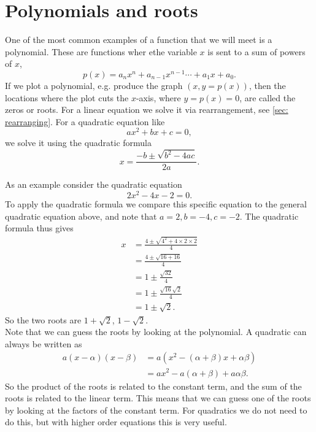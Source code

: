 \section{Polynomials and roots}
One of the most common examples of a function that we will meet is a polynomial. These are functions wher ethe variable $x$ is sent to a sum of powers of $x$,
\begin{equation}
p(x)=a_{n}x^{n}+a_{n-1}x^{n-1}\cdots +a_{1}x+a_{0}.
\label{eq: polynomial}
\end{equation}
If we plot a polynomial, e.g. produce the graph $(x,y=p(x))$, then the locations where the plot cuts the $x$-axis, where $y=p(x)=0$, are called the zeros or roots. For a linear equation we solve it via rearrangement, see \cref{sec: rearranging}. For a quadratic equation like
\begin{equation*}
ax^{2}+bx+c=0,
\end{equation*}
we solve it using the quadratic formula
\begin{equation}
x=\frac{-b\pm\sqrt{b^{2}-4ac}}{2a}.
\end{equation}

As an example consider the quadratic equation
\begin{equation*}
2x^{2}-4x-2=0.
\end{equation*}
To apply the quadratic formula we compare this specific equation to the general quadratic equation above, and note that $a=2,b=-4,c=-2$. The quadratic formula thus gives
\begin{align*}
x 	&=\frac{4\pm\sqrt{4^{2}+4\times2\times2}}{4}\\
	&=\frac{4\pm\sqrt{16+16}}{4}\\
	&=1\pm\frac{\sqrt{32}}{4}\\
	&=1\pm\frac{\sqrt{16}\sqrt{2}}{4}\\
	&=1\pm\sqrt{2}.
\end{align*}
So the two roots are $1+\sqrt{2}$, $1-\sqrt{2}$.\\

Note that we can guess the roots by looking at the polynomial. A quadratic can always be written as 
\begin{align*}
a(x-\alpha)(x-\beta)	&=a\left(x^{2}-(\alpha+\beta)x+\alpha\beta\right)\\
				&=ax^{2}-a\left(\alpha+\beta\right)+a\alpha\beta.
\end{align*}
So the product of the roots is related to the constant term, and the sum of the roots is related to the linear term. This means that we can guess one of the roots by looking at the factors of the constant term. For quadratics we do not need to do this, but with higher order equations this is very useful.\\

